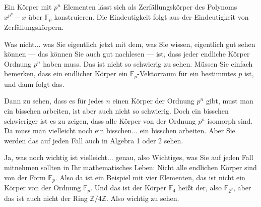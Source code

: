 \begin{math-stroke}

\begin{explanation-of-steps}
Ein Körper mit $p^n$ Elementen lässt sich als Zerfällungskörper des Polynoms $x^{p^n} - x$ über $\mathbb{F}_p$ konstruieren. Die Eindeutigkeit folgt aus der Eindeutigkeit von Zerfällungskörpern.
\end{explanation-of-steps}
\end{math-stroke}

\begin{ai-global-state-checkpoint-invisible-content}
\end{ai-global-state-checkpoint-invisible-content}

\begin{spoken-clean}[01:02:09 - 01:04:39]
Was nicht... was Sie eigentlich jetzt mit dem, was Sie wissen, eigentlich gut sehen können --- das können Sie auch gut nachlesen --- ist, dass jeder endliche Körper Ordnung $p^n$ haben muss. Das ist nicht so schwierig zu sehen. Müssen Sie einfach bemerken, dass ein endlicher Körper ein $\mathbb{F}_p$-Vektorraum für ein bestimmtes $p$ ist, und dann folgt das. 

Dann zu sehen, dass es für jedes $n$ einen Körper der Ordnung $p^n$ gibt, must man ein bisschen arbeiten, ist aber auch nicht so schwierig. Doch ein bisschen schwieriger ist es zu zeigen, dass alle Körper von der Ordnung $p^n$ isomorph sind. Da muss man vielleicht noch ein bisschen... ein bisschen arbeiten. Aber Sie werden das auf jeden Fall auch in Algebra 1 oder 2 sehen. 

Ja, was noch wichtig ist vielleicht... genau, also Wichtiges, was Sie auf jeden Fall mitnehmen sollten in Ihr mathematisches Leben: Nicht alle endlichen Körper sind von der Form $\mathbb{F}_p$. Also da ist ein Beispiel mit vier Elementen, das ist nicht ein Körper von der Ordnung $\mathbb{F}_p$. Und das ist der Körper $\mathbb{F}_4$ heißt der, also $\mathbb{F}_{2^2}$, aber das ist auch nicht der Ring $\mathbb{Z}/4\mathbb{Z}$. Also wichtig zu sehen.
\end{spoken-clean}

